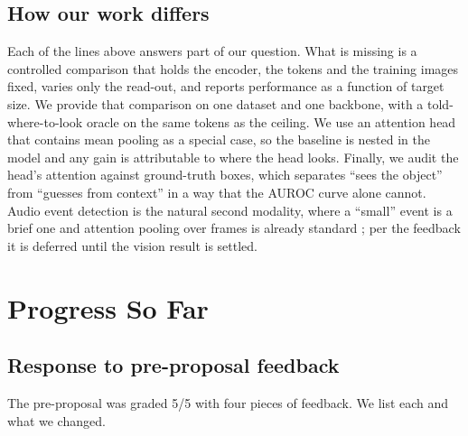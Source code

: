\documentclass[10pt,letterpaper,twocolumn]{article}
\begin{document}
\subsection{How our work differs}
Each of the lines above answers part of our question. What is missing is a controlled comparison
that holds the encoder, the tokens and the training images fixed, varies only the read-out, and
reports performance as a function of target size. We provide that comparison on one dataset and
one backbone, with a told-where-to-look oracle on the same tokens as the ceiling. We use an
attention head that contains mean pooling as a special case, so the baseline is nested in the
model and any gain is attributable to where the head looks. Finally, we audit the head's
attention against ground-truth boxes, which separates ``sees the object'' from ``guesses from
context'' in a way that the AUROC curve alone cannot. Audio event detection is the natural second modality, where a ``small'' event is a brief one
and attention pooling over frames is already standard \citep{kong2019attention,chen2023beats};
per the feedback it is deferred until the vision result is settled.

\section{Progress So Far}
\label{sec:progress}

\subsection{Response to pre-proposal feedback}
\label{sec:feedback}
The pre-proposal was graded 5/5 with four pieces of feedback. We list each and what we changed.
\end{document}
